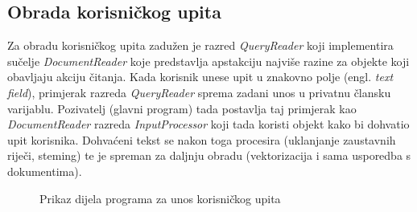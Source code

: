 \documentclass[times, utf8, zavrsni]{fer}
\begin{document}
\subsection{Obrada korisničkog upita}
Za obradu korisničkog upita zadužen je razred \textit{QueryReader} koji implementira sučelje \textit{DocumentReader} koje predstavlja apstakciju najviše razine za objekte koji obavljaju akciju čitanja. Kada korisnik unese upit u znakovno polje (engl. \textit{text field}), primjerak razreda \textit{QueryReader} sprema zadani unos u privatnu člansku varijablu. Pozivatelj (glavni program) tada postavlja taj primjerak kao \textit{DocumentReader} razreda \textit{InputProcessor} koji tada koristi objekt kako bi dohvatio upit korisnika. Dohvaćeni tekst se nakon toga procesira (uklanjanje zaustavnih riječi, steming) te je spreman za daljnju obradu (vektorizacija i sama usporedba s dokumentima).
\begin{figure}
\caption{Prikaz dijela programa za unos korisničkog upita}
\label{img:query_search}
\end{figure}
\end{document}
